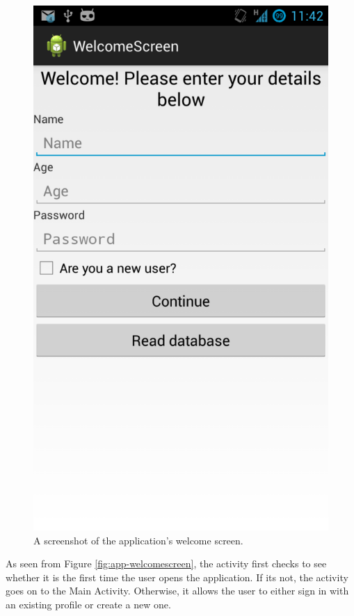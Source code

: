 \begin{figure}
 \centering 
 \includegraphics[clip = true, trim = 0 320 0 60, scale=0.2]{welcome_screen}
 \caption{A screenshot of the application's welcome screen.}
 \label{fig:welcomescreen-screenshot}
\end{figure}

As seen from Figure \ref{fig:app-welcomescreen}, the
activity first checks to see whether it is the first time the user opens the
application. If its not, the activity goes on to the Main Activity. Otherwise, it allows
the user to either sign in with an existing profile or create a new one.

